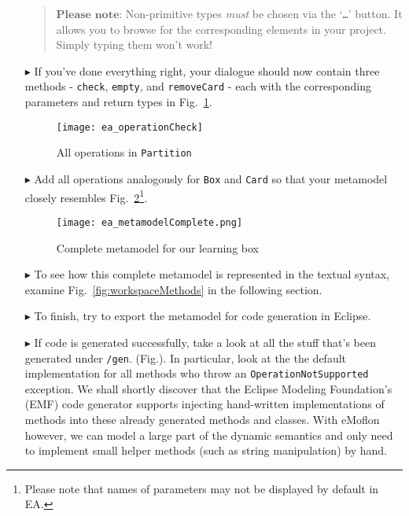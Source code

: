 \begin{enumerate}
\vspace{-.3cm}
\begin{quote}
{ \small
$\textbf{Please note:}$ Non-primitive types \emph{must} be chosen via the `\texttt{\ldots}' button. It allows you to browse for the corresponding elements in
your project. Simply typing them won't work!
}
\end{quote}

\item[$\blacktriangleright$] If you've done everything right, your dialogue should now contain three methods - \texttt{check}, \texttt{empty}, and
\texttt{removeCard} - each with the corresponding parameters and return types in Fig.~\ref{fig:operation_partition}.

\begin{figure}[htbp]
	\centering
  \texttt{[image: ea\_operationCheck]}
	\caption{All operations in \texttt{Partition}}
	\label{fig:operation_partition}
\end{figure}

\item[$\blacktriangleright$] Add all operations analogously for \texttt{Box} and \texttt{Card} so that your metamodel closely resembles
Fig.~\ref{fig:metamodel_complete}\footnote{Please note that names of parameters may not be displayed by default in EA.}.

\begin{figure}[htbp]
	\centering
  \texttt{[image: ea\_metamodelComplete.png]}
\caption[Complete metamodel for our learning box.]{Complete metamodel for our learning box}
	\label{fig:metamodel_complete}
\end{figure}

\pagebreak

\item[$\blacktriangleright$] To see how this complete metamodel is represented in the textual syntax, examine Fig.~\ref{fig:workspaceMethods} in the following
section.

\item[$\blacktriangleright$] To finish, try to export the metamodel for code generation in Eclipse.

\item[$\blacktriangleright$]  If code is generated successfully, take a look at all the stuff that's been generated under \texttt{/gen}. (Fig.). In particular,
look at the the default implementation for all methods who throw an \texttt{OperationNotSupported} exception. We shall shortly discover that the Eclipse
Modeling Foundation's (EMF) code generator supports injecting hand-written implementations of methods into these already generated methods and classes.
With eMoflon however, we can model a large part of the dynamic semantics and only need to implement small helper methods (such as string manipulation) by
hand.

\end{enumerate}

